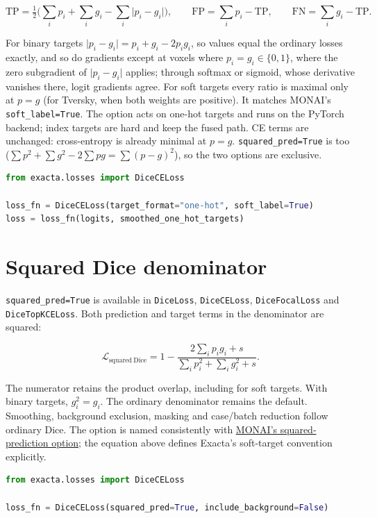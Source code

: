 \[
\mathrm{TP}=\tfrac{1}{2}\Big(\sum_i p_i+\sum_i g_i-\sum_i\lvert p_i-g_i\rvert\Big),\qquad
\mathrm{FP}=\sum_i p_i-\mathrm{TP},\qquad \mathrm{FN}=\sum_i g_i-\mathrm{TP}.
\]

For binary targets \(\lvert p_i-g_i\rvert=p_i+g_i-2p_ig_i\), so values equal the ordinary losses
exactly, and so do gradients except at voxels where \(p_i=g_i\in\{0,1\}\), where the zero
subgradient of \(\lvert p_i-g_i\rvert\) applies; through softmax or sigmoid, whose derivative
vanishes there, logit gradients agree. For soft targets every ratio is maximal only at \(p=g\) (for Tversky,
when both weights are positive). It matches MONAI's \texttt{soft\_label=True}. The option acts on
one-hot targets and runs on the PyTorch backend; index targets are hard and keep the fused
path. CE terms are
unchanged: cross-entropy is already minimal at \(p=g\). \texttt{squared\_pred=True} is too
(\(\sum p^2+\sum g^2-2\sum pg=\sum(p-g)^2\)), so the two options are exclusive.

\begin{lstlisting}[language=Python]
from exacta.losses import DiceCELoss

loss_fn = DiceCELoss(target_format="one-hot", soft_label=True)
loss = loss_fn(logits, smoothed_one_hot_targets)
\end{lstlisting}

\section{Squared Dice denominator}\label{losses:squared-dice-denominator}

\texttt{squared\_pred=True} is available in \texttt{DiceLoss}, \texttt{DiceCELoss}, \texttt{DiceFocalLoss}
and \texttt{DiceTopKCELoss}. Both prediction and target terms in the denominator are squared:

\[
\mathcal{L}_{\mathrm{squared\ Dice}}
=1-\frac{2\sum_i p_i g_i+s}{\sum_i p_i^2+\sum_i g_i^2+s}.
\]

The numerator retains the product overlap, including for soft targets. With binary targets,
\(g_i^2=g_i\). The ordinary denominator remains the default. Smoothing, background exclusion,
masking and case/batch reduction follow ordinary Dice. The option is named consistently with
\href{https://monai.readthedocs.io/en/stable/losses.html\#diceloss}{MONAI's squared-prediction option};
the equation above defines Exacta's soft-target convention explicitly.

\begin{lstlisting}[language=Python]
from exacta.losses import DiceCELoss

loss_fn = DiceCELoss(squared_pred=True, include_background=False)
\end{lstlisting}

